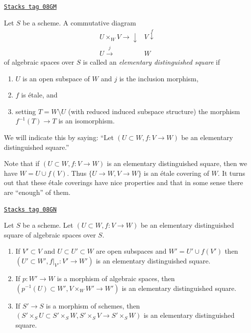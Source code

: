 \begin{definition}
\label{spaces-perfect-definition-elementary-distinguished-square}
\href{https://stacks.math.columbia.edu/tag/08GM}{\texttt{Stacks tag 08GM}}

Let $S$ be a scheme. A commutative diagram
$$
\begin{array}{cc}U \times_W V \longrightarrow\downarrow & V \overset{f}{\downarrow} \\ U \overset{j}{\longrightarrow} & W\end{array}
$$
of algebraic spaces over $S$ is called an {\it elementary distinguished square}
if
\begin{enumerate}
\item $U$ is an open subspace of $W$ and $j$ is the inclusion morphism,
\item $f$ is \'etale, and
\item setting $T = W \setminus U$ (with reduced induced
subspace structure) the morphism $f^{-1}(T) \to T$ is an isomorphism.
\end{enumerate}
We will indicate this by saying: ``Let $(U \subset W, f : V \to W)$
be an elementary distinguished square.''
\end{definition}

Note that if $(U \subset W, f : V \to W)$ is an elementary distinguished
square, then we have $W = U \cup f(V)$. Thus $\{U \to W, V \to W\}$ is
an \'etale covering of $W$. It turns out that these \'etale coverings
have nice properties and that in some sense
there are ``enough'' of them.

\begin{lemma}
\label{spaces-perfect-lemma-make-more-elementary-distinguished-squares}
\href{https://stacks.math.columbia.edu/tag/08GN}{\texttt{Stacks tag 08GN}}

Let $S$ be a scheme. Let $(U \subset W, f : V \to W)$ be an elementary
distinguished square of algebraic spaces over $S$.
\begin{enumerate}
\item If $V' \subset V$ and
$U \subset U' \subset W$ are open subspaces and $W' = U' \cup f(V')$
then $(U' \subset W', f|_{V'} : V' \to W')$ is an elementary distinguished
square.
\item If $p : W' \to W$ is a morphism of algebraic spaces, then
$(p^{-1}(U) \subset W', V \times_W W' \to W')$ is an elementary distinguished
square.
\item If $S' \to S$ is a morphism of schemes, then
$(S' \times_S U \subset S' \times_S W, S' \times_S V \to S' \times_S W)$
is an elementary distinguished square.
\end{enumerate}
\end{lemma}

